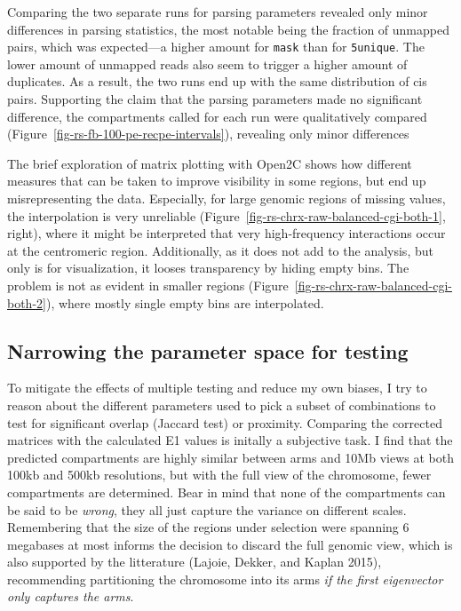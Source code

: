 \documentclass[
  11pt,
  a4paper,
]{scrbook}
\begin{document}
Comparing the two separate runs for parsing parameters revealed only
minor differences in parsing statistics, the most notable being the
fraction of unmapped pairs, which was expected---a higher amount for
\texttt{mask} than for \texttt{5unique}. The lower amount of unmapped
reads also seem to trigger a higher amount of duplicates. As a result,
the two runs end up with the same distribution of cis pairs. Supporting
the claim that the parsing parameters made no significant difference,
the compartments called for each run were qualitatively compared
(Figure~\ref{fig-rs-fb-100-pe-recpe-intervals}), revealing only minor
differences

The brief exploration of matrix plotting with Open2C shows how different
measures that can be taken to improve visibility in some regions, but
end up misrepresenting the data. Especially, for large genomic regions
of missing values, the interpolation is very unreliable
(Figure~\ref{fig-rs-chrx-raw-balanced-cgi-both-1}, right), where it
might be interpreted that very high-frequency interactions occur at the
centromeric region. Additionally, as it does not add to the analysis,
but only is for visualization, it looses transparency by hiding empty
bins. The problem is not as evident in smaller regions
(Figure~\ref{fig-rs-chrx-raw-balanced-cgi-both-2}), where mostly single
empty bins are interpolated.

\subsection{Narrowing the parameter space for
testing}\label{narrowing-the-parameter-space-for-testing}

To mitigate the effects of multiple testing and reduce my own biases, I
try to reason about the different parameters used to pick a subset of
combinations to test for significant overlap (Jaccard test) or
proximity. Comparing the corrected matrices with the calculated E1
values is initally a subjective task. I find that the predicted
compartments are highly similar between arms and 10Mb views at both
100kb and 500kb resolutions, but with the full view of the chromosome,
fewer compartments are determined. Bear in mind that none of the
compartments can be said to be \emph{wrong}, they all just capture the
variance on different scales. Remembering that the size of the regions
under selection were spanning 6 megabases at most informs the decision
to discard the full genomic view, which is also supported by the
litterature (Lajoie, Dekker, and Kaplan 2015), recommending partitioning
the chromosome into its arms \emph{if the first eigenvector only
captures the arms}.
\end{document}
